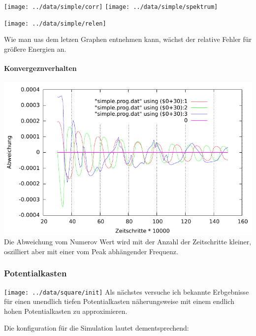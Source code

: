 \documentclass[10pt,a4paper,german]{scrartcl}
\begin{document}
		  	\texttt{[image: ../data/simple/corr]}
    		\texttt{[image: ../data/simple/spektrum]}
    		
			  \begin{center}\end{center}
  			
	  		\texttt{[image: ../data/simple/relen]}
		  	
			  Wie man uas dem letzen Graphen entnehmen kann, wächst
  			der relative Fehler für größere Energien an.
  			
  			\paragraph*{Konvergeznverhalten}
  			  \includegraphics[scale=.62]{../static/simple_konv.pdf}
  			  Die Abweichung vom Numerov Wert wird mit der Anzahl der
  			  Zeitschritte kleiner, oszilliert aber
  			  mit einer vom Peak abhängender Frequenz.
			
  	  \subsubsection{Potentialkasten}
  			\texttt{[image: ../data/square/init]}
  			Als nächstes versuche ich bekannte Erbgebnisse für einen
	  		unendlich tiefen Potentialkasten näherungsweise mit einem
	  		endlich hohen  Potentialkasten zu approximieren.
	  		
	  		Die konfiguration für die Simulation lautet dementsprechend:
				
				
\end{document}
